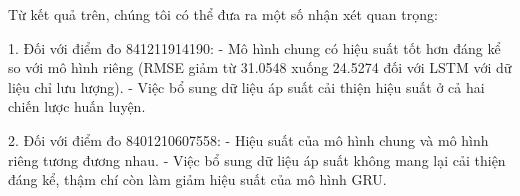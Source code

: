 Từ kết quả trên, chúng tôi có thể đưa ra một số nhận xét quan trọng:

1. Đối với điểm đo 841211914190:
   - Mô hình chung có hiệu suất tốt hơn đáng kể so với mô hình riêng (RMSE giảm từ 31.0548 xuống 24.5274 đối với LSTM với dữ liệu chỉ lưu lượng).
   - Việc bổ sung dữ liệu áp suất cải thiện hiệu suất ở cả hai chiến lược huấn luyện.

2. Đối với điểm đo 8401210607558:
   - Hiệu suất của mô hình chung và mô hình riêng tương đương nhau.
   - Việc bổ sung dữ liệu áp suất không mang lại cải thiện đáng kể, thậm chí còn làm giảm hiệu suất của mô hình GRU.
